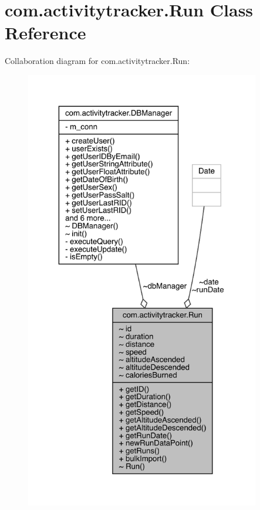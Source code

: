 \hypertarget{classcom_1_1activitytracker_1_1_run}{}\section{com.\+activitytracker.\+Run Class Reference}
\label{classcom_1_1activitytracker_1_1_run}


Collaboration diagram for com.\+activitytracker.\+Run\+:
\nopagebreak
\begin{figure}[H]
\begin{center}
\leavevmode
\includegraphics[height=550pt]{classcom_1_1activitytracker_1_1_run__coll__graph}
\end{center}
\end{figure}
